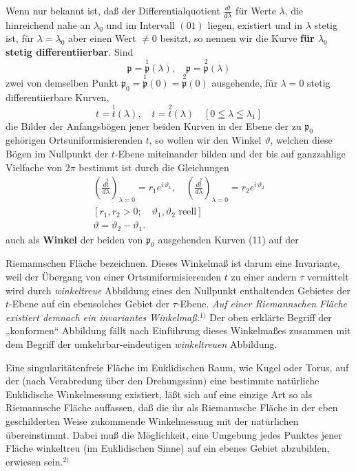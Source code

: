 \documentclass{article}
\begin{document}
Wenn nur bekannt ist, daß der Differentialquotient $\frac{dt}{d\lambda}$ für Werte $\lambda$, die hinreichend nahe an $\lambda_0$ und im Intervall $(01)$ liegen, existiert und in $\lambda$ stetig ist, für $\lambda = \lambda_0$ aber einen Wert $\neq 0$ besitzt, so nennen wir die Kurve \textbf{für $\lambda_0$ stetig differentiierbar}. Sind
\[ \mathfrak{p} = \overset{1}{\mathfrak{p}}(\lambda), \quad \mathfrak{p} = \overset{2}{\mathfrak{p}}(\lambda) \tag{11} \]
zwei von demselben Punkt $\mathfrak{p}_0 = \overset{1}{\mathfrak{p}}(0) = \overset{2}{\mathfrak{p}}(0)$ ausgehende, für $\lambda = 0$ stetig differentiierbare Kurven,
\[ t = \overset{1}{t}(\lambda), \quad t = \overset{2}{t}(\lambda) \quad [0 \leqq \lambda \leqq \lambda_1] \]
die Bilder der Anfangsbögen jener beiden Kurven in der Ebene der zu $\mathfrak{p}_0$ gehörigen Ortsuniformisierenden $t$, so wollen wir den Winkel $\vartheta$, welchen diese Bögen im Nullpunkt der $t$-Ebene miteinander bilden und der bis auf ganzzahlige Vielfache von $2\pi$ bestimmt ist durch die Gleichungen
\[ \begin{gathered}
\left(\frac{d\overset{1}{t}}{d\lambda}\right)_{\lambda = 0} = r_1 e^{i\,\vartheta_1}, \quad \left(\frac{d\overset{2}{t}}{d\lambda}\right)_{\lambda = 0} = r_2 e^{i\,\vartheta_2} \\
[r_1, r_2 > 0; \quad \vartheta_1, \vartheta_2 \text{ reell}] \\
\vartheta = \vartheta_2 - \vartheta_1.
\end{gathered} \]
auch als \textbf{Winkel} der beiden von $\mathfrak{p}_0$ ausgehenden Kurven (11) auf der

Riemannschen Fläche bezeichnen. Dieses Winkelmaß ist darum eine Invariante, weil der Übergang von einer Ortsuniformisierenden $t$ zu einer andern $\tau$ vermittelt wird durch \emph{winkeltreue} Abbildung eines den Nullpunkt enthaltenden Gebietes der $t$-Ebene auf ein ebensolches Gebiet der $\tau$-Ebene. \emph{Auf einer Riemannschen Fläche existiert demnach ein invariantes Winkelmaß.}${}^{1)}$ Der oben erklärte Begriff der „konformen“ Abbildung fällt nach Einführung dieses Winkelmaßes zusammen mit dem Begriff der umkehrbar-eindeutigen \emph{winkeltreuen} Abbildung.

Eine singularitätenfreie Fläche im Euklidischen Raum, wie Kugel oder Torus, auf der (nach Verabredung über den Drehungssinn) eine bestimmte natürliche Euklidische Winkelmessung existiert, läßt sich auf eine einzige Art so als Riemannsche Fläche auffassen, daß die ihr als Riemannsche Fläche in der eben geschilderten Weise zukommende Winkelmessung mit der natürlichen übereinstimmt. Dabei muß die Möglichkeit, eine Umgebung jedes Punktes jener Fläche winkeltreu (im Euklidischen Sinne) auf ein ebenes Gebiet abzubilden, erwiesen sein.${}^{2)}$
\end{document}
